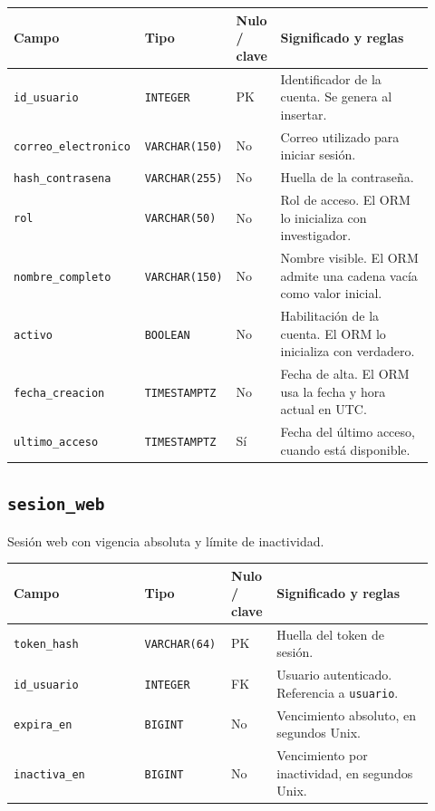 \noindent
\begin{tabular}{@{}p{0.30\linewidth}p{0.16\linewidth}p{0.10\linewidth}p{0.36\linewidth}@{}}
\hline
\textbf{Campo} & \textbf{Tipo} & \textbf{Nulo / clave} & \textbf{Significado y reglas} \\
\hline
\texttt{id\_\allowbreak{}usuario} & \texttt{INTEGER} & PK & Identificador de la cuenta. Se genera al insertar. \\
\texttt{correo\_\allowbreak{}electronico} & \texttt{VARCHAR(150)} & No & Correo utilizado para iniciar sesión. \\
\texttt{hash\_\allowbreak{}contrasena} & \texttt{VARCHAR(255)} & No & Huella de la contraseña. \\
\texttt{rol} & \texttt{VARCHAR(50)} & No & Rol de acceso. El ORM lo inicializa con investigador. \\
\texttt{nombre\_\allowbreak{}completo} & \texttt{VARCHAR(150)} & No & Nombre visible. El ORM admite una cadena vacía como valor inicial. \\
\texttt{activo} & \texttt{BOOLEAN} & No & Habilitación de la cuenta. El ORM lo inicializa con verdadero. \\
\texttt{fecha\_\allowbreak{}creacion} & \texttt{TIMESTAMPTZ} & No & Fecha de alta. El ORM usa la fecha y hora actual en UTC. \\
\texttt{ultimo\_\allowbreak{}acceso} & \texttt{TIMESTAMPTZ} & Sí & Fecha del último acceso, cuando está disponible. \\
\hline
\end{tabular}

\subsection*{\texttt{sesion\_\allowbreak{}web}}

Sesión web con vigencia absoluta y límite de inactividad.

\noindent
\begin{tabular}{@{}p{0.30\linewidth}p{0.16\linewidth}p{0.10\linewidth}p{0.36\linewidth}@{}}
\hline
\textbf{Campo} & \textbf{Tipo} & \textbf{Nulo / clave} & \textbf{Significado y reglas} \\
\hline
\texttt{token\_\allowbreak{}hash} & \texttt{VARCHAR(64)} & PK & Huella del token de sesión. \\
\texttt{id\_\allowbreak{}usuario} & \texttt{INTEGER} & FK & Usuario autenticado. Referencia a \texttt{usuario}. \\
\texttt{expira\_\allowbreak{}en} & \texttt{BIGINT} & No & Vencimiento absoluto, en segundos Unix. \\
\texttt{inactiva\_\allowbreak{}en} & \texttt{BIGINT} & No & Vencimiento por inactividad, en segundos Unix. \\
\hline
\end{tabular}

